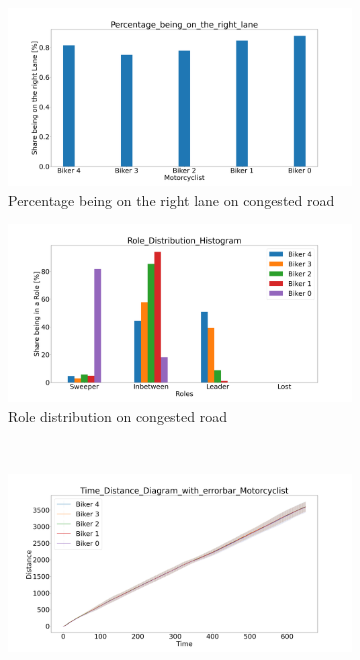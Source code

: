 \begin{figure}[H]
    \centering
    \begin{subfigure}[b]{0.45\textwidth}
        \centering
        \includegraphics[width=1.0\textwidth]{images/Nordracher/Nordracher_Percentage_being_on_the_right_lane_congested.png}
        \caption{Percentage being on the right lane on congested road}
    \end{subfigure}
    \hfill
    \begin{subfigure}[b]{0.45\textwidth}
        \centering
        \includegraphics[width=1.0\textwidth]{images/Nordracher/Nordracher_Role_Distribution_Histogram_congested.png}
        \caption{Role distribution on congested road}
    \end{subfigure}
    \\
    \begin{subfigure}[b]{0.45\textwidth}
        \centering
        \includegraphics[width=1.0\textwidth]{images/Nordracher/Nordracher_Time_Distance_Diagram_with_errorbar_congested.png}

\end{subfigure}
\end{figure}
